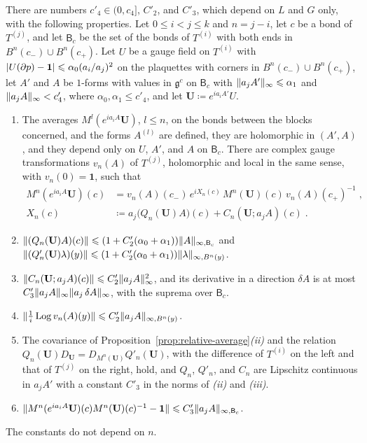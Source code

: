 \documentclass[11pt]{preprint}
\newcommand{\id}{\mathbf 1}
\DeclarePairedDelimiter{\abs}{\lvert}{\rvert}
\DeclarePairedDelimiter{\norm}{\lVert}{\rVert}
\numberwithin{equation}{section}
\begin{document}
\begin{proposition}\label{prop:relative-average-order}
There are numbers $c'_4 \in (0, c_4]$, $C'_2$, and $C'_3$, which depend on $L$ and $G$ only, with the following properties. Let $0 \leqslant i < j \leqslant k$ and $n = j - i$, let $c$ be a bond of $T^{(j)}$, and let $\mathsf B_c$ be the set of the bonds of $T^{(i)}$ with both ends in $B^n(c_-) \cup B^n(c_+)$. Let $U$ be a gauge field on $T^{(i)}$ with $\abs{U(\partial p) - \id} \leqslant \alpha_0(a_i/a_j)^2$ on the plaquettes with corners in $B^n(c_-) \cup B^n(c_+)$, let $A'$ and $A$ be $1$-forms with values in $\mathfrak g^c$ on $\mathsf B_c$ with $\norm{a_jA'}_\infty \leqslant \alpha_1$ and $\norm{a_jA}_\infty < c'_4$, where $\alpha_0, \alpha_1 \leqslant c'_4$, and let $\mathbf U \coloneqq e^{ia_iA'}U$.
\begin{enumerate}[label=(\roman*)]
\item The averages $M^l(e^{ia_iA}\mathbf U)$, $l \leqslant n$, on the bonds between the blocks concerned, and the forms $A^{(l)}$ are defined, they are holomorphic in $(A', A)$, and they depend only on $U$, $A'$, and $A$ on $\mathsf B_c$. There are complex gauge transformations $v_n(A)$ of $T^{(j)}$, holomorphic and local in the same sense, with $v_n(0) = \id$, such that
\begin{equation}\label{eq:average-of-product-order}
\begin{aligned}
    M^n(e^{ia_iA}\mathbf U)(c) &= v_n(A)(c_-)\,e^{iX_n(c)}\,M^n(\mathbf U)(c)\,v_n(A)(c_+)^{-1}\;,\\
    X_n(c) &\coloneqq a_j\bigl(Q_n(\mathbf U)A\bigr)(c) + C_n(\mathbf U; a_jA)(c)\;.
\end{aligned}
\end{equation}
\item $\norm{(Q_n(\mathbf U)A)(c)} \leqslant (1 + C'_2(\alpha_0 + \alpha_1))\norm A_{\infty,\mathsf B_c}$ and $\norm{(Q'_n(\mathbf U)\lambda)(y)} \leqslant (1 + C'_2(\alpha_0 + \alpha_1))\norm\lambda_{\infty,B^n(y)}$.
\item $\norm{C_n(\mathbf U; a_jA)(c)} \leqslant C'_2\norm{a_jA}_\infty^2$, and its derivative in a direction $\delta A$ is at most $C'_3\norm{a_jA}_\infty\norm{a_j\,\delta A}_\infty$, with the suprema over $\mathsf B_c$.
\item $\norm{\frac{1}{i}\operatorname{Log}v_n(A)(y)} \leqslant C'_2\norm{a_jA}_{\infty,B^n(y)}$.
\item The covariance of Proposition~\ref{prop:relative-average}\emph{(ii)} and the relation $Q_n(\mathbf U)D_{\mathbf U} = D_{M^n(\mathbf U)}Q'_n(\mathbf U)$, with the difference of $T^{(i)}$ on the left and that of $T^{(j)}$ on the right, hold, and $Q_n$, $Q'_n$, and $C_n$ are Lipschitz continuous in $a_jA'$ with a constant $C'_3$ in the norms of \emph{(ii)} and \emph{(iii)}.
\item $\norm{M^n(e^{ia_iA}\mathbf U)(c)M^n(\mathbf U)(c)^{-1} - \id} \leqslant C'_3\norm{a_jA}_{\infty,\mathsf B_c}$.
\end{enumerate}
The constants do not depend on $n$.
\end{proposition}
\end{document}
